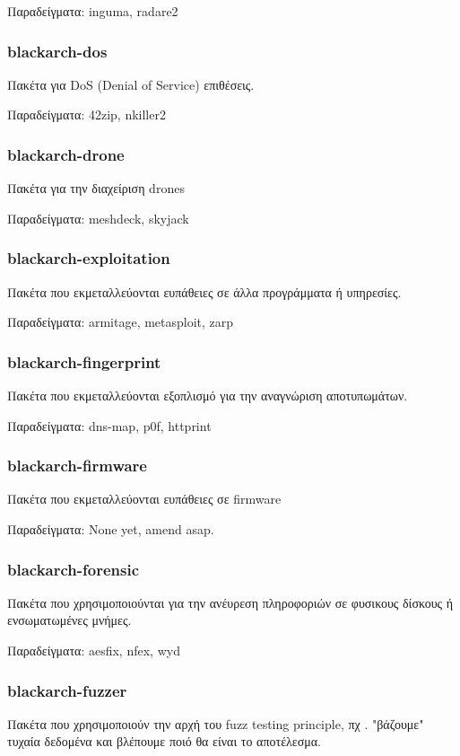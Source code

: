 \documentclass[a4paper, oneside, 11pt]{book}
\begin{document}
Παραδείγματα: inguma, radare2

\subsubsection{blackarch-dos}
Πακέτα για DoS (Denial of Service) επιθέσεις.

Παραδείγματα: 42zip, nkiller2

\subsubsection{blackarch-drone}
Πακέτα για την διαχείριση drones

Παραδείγματα: meshdeck, skyjack

\subsubsection{blackarch-exploitation}
Πακέτα που εκμεταλλεύονται ευπάθειες σε άλλα προγράμματα ή υπηρεσίες.

Παραδείγματα: armitage, metasploit, zarp

\subsubsection{blackarch-fingerprint}
Πακέτα που εκμεταλλεύονται εξοπλισμό για την αναγνώριση αποτυπωμάτων.

Παραδείγματα: dns-map, p0f, httprint

\subsubsection{blackarch-firmware}
Πακέτα που εκμεταλλεύονται ευπάθειες σε firmware

Παραδείγματα: None yet, amend asap.

\subsubsection{blackarch-forensic}
Πακέτα που χρησιμοποιούνται για την ανέυρεση πληροφοριών σε φυσικους δίσκους
ή ενσωματωμένες μνήμες.

Παραδείγματα: aesfix, nfex, wyd

\subsubsection{blackarch-fuzzer}
Πακέτα που χρησιμοποιούν την αρχή του fuzz testing principle,
πχ . "βάζουμε" τυχαία δεδομένα και βλέπουμε ποιό θα είναι το αποτέλεσμα.
\end{document}
